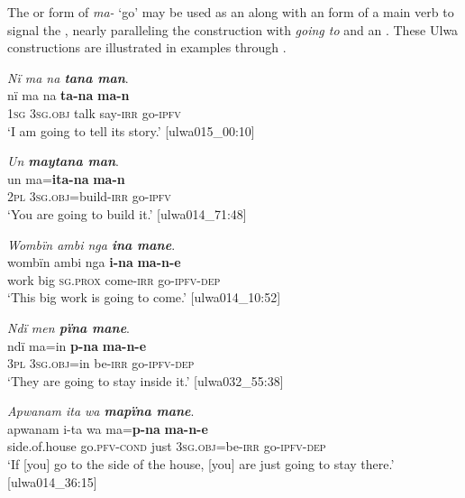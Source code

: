   The  or  form of \textit{ma-} ‘go’ may be used as an  along with an  form of a main verb to signal the , nearly paralleling the    construction with \textit{going to} and an . These Ulwa  constructions are illustrated in examples  through .

\ea%
    \label{ex:pred:52}
          \textit{Nï ma na \textbf{tana man}}.\\
\gll nï    ma      na    \textbf{ta-na}    \textbf{ma-n}\\
    1\textsc{sg}  3\textsc{sg.obj}  talk  say-\textsc{irr}  go-\textsc{ipfv}\\
\glt `I am going to tell its story.’ [ulwa015\_00:10]
\z

\ea%
    \label{ex:pred:53}
          \textit{Un \textbf{maytana man}}.\\
\gll un  ma=\textbf{ita-na}        \textbf{ma-n}\\
    2\textsc{pl}  3\textsc{sg.obj}=build-\textsc{irr}  go-\textsc{ipfv}\\
\glt `You are going to build it.’ [ulwa014\_71:48]
\z

\ea%
    \label{ex:pred:54}
          \textit{Wombïn ambi nga \textbf{ina mane}}.\\
\gll wombïn  ambi  nga      \textbf{i-na}    \textbf{ma-n-e}\\
    work    big    \textsc{sg.prox}  come-\textsc{irr}  go-\textsc{ipfv-dep}\\
\glt `This big work is going to come.’ [ulwa014\_10:52]
\z

\ea%
    \label{ex:pred:55}
          \textit{Ndï men \textbf{pïna mane}}.\\
\gll ndï  ma=in      \textbf{p-na}  \textbf{ma-n-e}\\
    3\textsc{pl}  3\textsc{sg.obj}=in  be-\textsc{irr}  go-\textsc{ipfv-dep}\\
\glt `They are going to stay inside it.’ [ulwa032\_55:38]
\z

\ea%
    \label{ex:pred:56}
          \textit{Apwanam ita wa \textbf{mapïna mane}}.\\
\gll apwanam    i-ta        wa  ma=\textbf{p-na}      \textbf{ma-n-e}\\
    side.of.house  go.\textsc{pfv}{}-\textsc{cond}  just  3\textsc{sg.obj}=be-\textsc{irr}  go-\textsc{ipfv-dep}\\
\glt `If [you] go to the side of the house, [you] are just going to stay there.’ [ulwa014\_36:15]
\z

